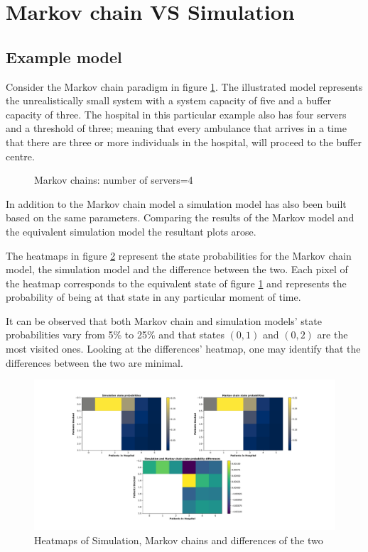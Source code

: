 \section{Markov chain VS Simulation}

\subsection{Example model}
Consider the Markov chain paradigm in figure \ref{Model_mini}. 
The illustrated model represents the unrealistically small system 
with a system capacity of five and a buffer capacity of three. 
The hospital in this particular example also has four servers and a threshold of 
three; meaning that every ambulance that arrives in a time that there are three or 
more individuals in the hospital, will proceed to the buffer centre.

\begin{figure}[h]
    \centering
    
    \caption{Markov chains: number of servers=4} 
    \label{Model_mini}
\end{figure}

In addition to the Markov chain model a simulation model has also been built based 
on the same parameters. 
Comparing the results of the Markov model and the equivalent simulation model the 
resultant plots arose.

The heatmaps in figure \ref{Heatmap_mini} represent the state probabilities for 
the Markov chain model, the simulation model and the difference between the two. 
Each pixel of the heatmap corresponds to the equivalent state of figure \ref{Model_mini} 
and represents the probability of being at that state in any particular moment of time.

It can be observed that both Markov chain and simulation models' state probabilities 
vary from 5\% to 25\% and that states \( (0, 1) \) and \( (0, 2) \) are the most 
visited ones. 
Looking at the differences' heatmap, one may identify that the differences between 
the two are minimal.

\newpage

\begin{figure}[h]
    \includegraphics[width=\linewidth]{Comparisons/Example_model/Heatmap/main.pdf}
    \caption{Heatmaps of Simulation, Markov chains and differences of the two}
    \label{Heatmap_mini}
\end{figure}



